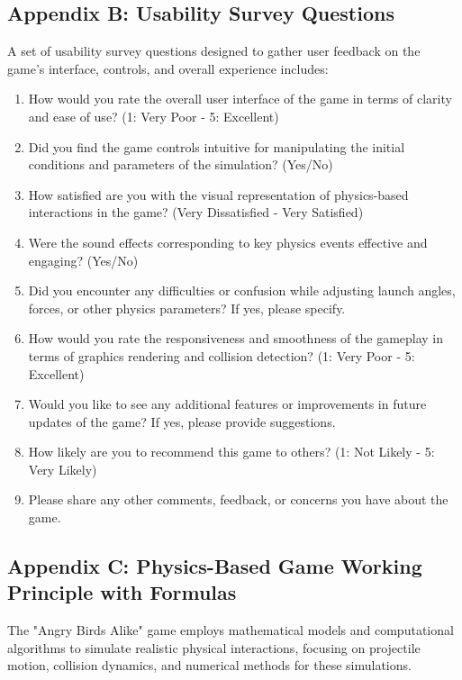 \documentclass[12pt]{article}
\begin{document}
\subsection{Appendix B: Usability Survey Questions}
A set of usability survey questions designed to gather user feedback on the game's interface, controls, and overall experience includes:
\begin{enumerate}
    \item How would you rate the overall user interface of the game in terms of clarity and ease of use? (1: Very Poor - 5: Excellent)
    \item Did you find the game controls intuitive for manipulating the initial conditions and parameters of the simulation? (Yes/No)
    \item How satisfied are you with the visual representation of physics-based interactions in the game? (Very Dissatisfied - Very Satisfied)
    \item Were the sound effects corresponding to key physics events effective and engaging? (Yes/No)
    \item Did you encounter any difficulties or confusion while adjusting launch angles, forces, or other physics parameters? If yes, please specify.
    \item How would you rate the responsiveness and smoothness of the gameplay in terms of graphics rendering and collision detection? (1: Very Poor - 5: Excellent)
    \item Would you like to see any additional features or improvements in future updates of the game? If yes, please provide suggestions.
    \item How likely are you to recommend this game to others? (1: Not Likely - 5: Very Likely)
    \item Please share any other comments, feedback, or concerns you have about the game.
\end{enumerate}

\subsection{Appendix C: Physics-Based Game Working Principle with Formulas}
The "Angry Birds Alike" game employs mathematical models and computational algorithms to simulate realistic physical interactions, focusing on projectile motion, collision dynamics, and numerical methods for these simulations.
\end{document}
